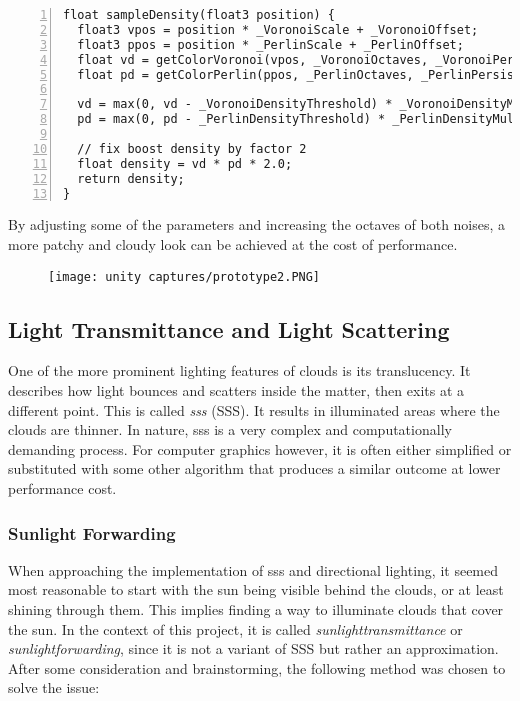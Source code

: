 \begin{lstlisting}[language=HLSL, numbers=left, caption=Implementation of a density sampling function., label=lst:shader:prototype:sampledensity]
float sampleDensity(float3 position) {
  float3 vpos = position * _VoronoiScale + _VoronoiOffset;
  float3 ppos = position * _PerlinScale + _PerlinOffset;
  float vd = getColorVoronoi(vpos, _VoronoiOctaves, _VoronoiPersistance));
  float pd = getColorPerlin(ppos, _PerlinOctaves, _PerlinPersistance));
  
  vd = max(0, vd - _VoronoiDensityThreshold) * _VoronoiDensityMultiplier;
  pd = max(0, pd - _PerlinDensityThreshold) * _PerlinDensityMultiplier;
  
  // fix boost density by factor 2
  float density = vd * pd * 2.0;
  return density;
}
\end{lstlisting}

\noindent
By adjusting some of the \gls{parameters} and increasing the octaves of both noises, a more patchy and cloudy look can be achieved at the cost of performance.

\begin{figure}[H]
    \centering
    \texttt{[image: unity captures/prototype2.PNG]}
    \label{img:captures:prototype2}
\end{figure}

\clearpage
\subsection{Light Transmittance and Light Scattering}
One of the more prominent lighting features of clouds is its translucency. It describes how light bounces and scatters inside the matter, then exits at a different point. This is called \textit{\gls{sss}} (SSS).
It results in illuminated areas where the clouds are thinner. In nature, \gls{sss} is a very complex and computationally demanding process. For computer graphics however, it is often either simplified or substituted with some other algorithm that produces a similar outcome at lower performance cost.

\subsubsection{Sunlight Forwarding}
When approaching the implementation of \gls{sss} and directional lighting, it seemed most reasonable to start with the sun being visible behind the clouds, or at least shining through them.
This implies finding a way to illuminate clouds that cover the sun. In the context of this project, it is called \textit{\gls{sunlighttransmittance}} or \textit{\gls{sunlightforwarding}}, since it is not a variant of SSS but rather an approximation.
\\
After some consideration and brainstorming, the following method was chosen to solve the issue:


